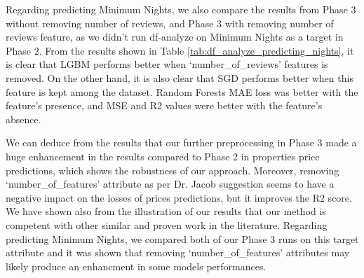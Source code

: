 \documentclass[a4paper,12pt]{article}
\begin{document}
Regarding predicting Minimum Nights, we also compare the results from Phase 3 without removing number of reviews, and Phase 3 with removing number of reviews feature, as we didn't run df-analyze on Minimum Nights as a target in Phase 2. From the results shown in Table \ref{tab:df_analyze_predicting_nights}, it is clear that LGBM performs better when `number\_of\_reviews' features is removed. On the other hand, it is also clear that SGD performs better when this feature is kept among the dataset. Random Forests MAE loss was better with the feature's presence, and MSE and R2 values were better with the feature's absence.

\begin{table}[h!]
    \centering
    \caption{df-Analyze Results of Predicting Minimum Nights}
    \label{tab:df_analyze_predicting_nights}
\end{table}

We can deduce from the results that our further preprocessing in Phase 3 made a huge enhancement in the results compared to Phase 2 in properties price predictions, which shows the robustness of our approach. Moreover, removing `number\_of\_features' attribute as per Dr. Jacob suggestion seems to have a negative impact on the losses of prices predictions, but it improves the R2 score. We have shown also from the illustration of our results that our method is competent with other similar and proven work in the literature. Regarding predicting Minimum Nights, we compared both of our Phase 3 runs on this target attribute and it was shown that removing `number\_of\_features' attributes may likely produce an enhancment in some models performances.
\end{document}
